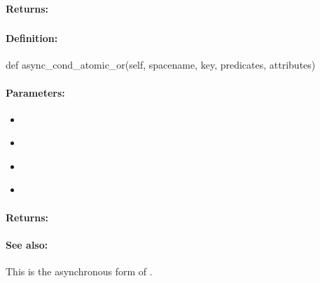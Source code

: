 \paragraph{Returns:}


\pagebreak
\subsubsection{}
\label{api:python:async_cond_atomic_or}


\paragraph{Definition:}
\begin{pythoncode}
def async_cond_atomic_or(self, spacename, key, predicates, attributes)
\end{pythoncode}

\paragraph{Parameters:}
\begin{itemize}[noitemsep]
\item {}\\

\item {}\\

\item {}\\

\item {}\\

\end{itemize}

\paragraph{Returns:}


\paragraph{See also:}  This is the asynchronous form of .


